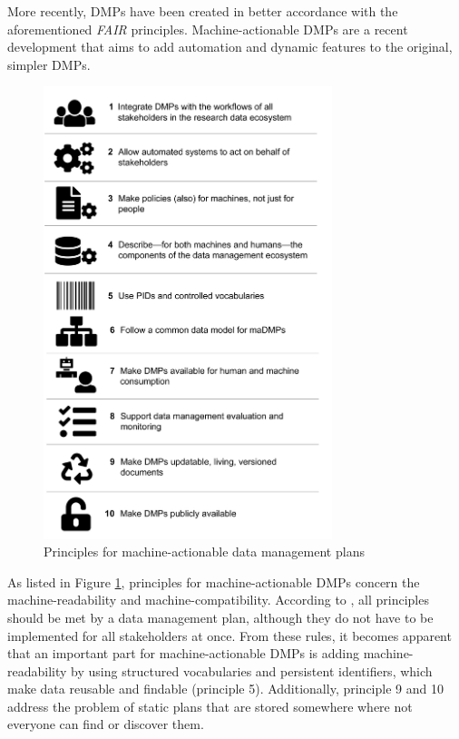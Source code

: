 \documentclass[10pt]{article}
\begin{document}
More recently, DMPs have been created in better accordance with the aforementioned \textit{FAIR} principles. Machine-actionable DMPs are a recent development that aims to add automation and dynamic features to the original, simpler DMPs. 
\begin{figure}
\centering
	\includegraphics[width=0.75\textwidth]{img/madmpall.jpg}
	\caption{Principles for machine-actionable data management plans \cite{madmp}}
	\label{fig:madmp}
\end{figure}
As listed in Figure \ref{fig:madmp}, principles for machine-actionable DMPs concern the machine-readability and machine-compatibility. According to \cite{madmp}, all principles should be met by a data management plan, although they do not have to be implemented for all stakeholders at once. From these rules, it becomes apparent that an important part for machine-actionable DMPs is adding machine-readability by using structured vocabularies and persistent identifiers, which make data reusable and findable (principle 5). Additionally, principle 9 and 10 address the problem of static plans that are stored somewhere where not everyone can find or discover them.\\
\end{document}
